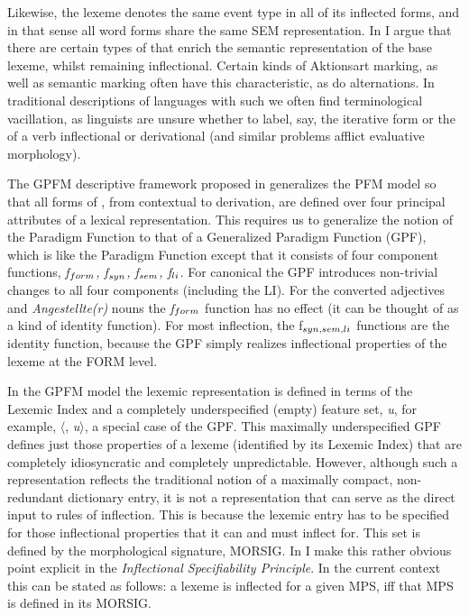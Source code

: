 \documentclass[output=paper,
modfonts
]{LSP/langsci}
\begin{document}
Likewise, the lexeme  denotes the same event type in all of its inflected forms, and in that sense all word forms share the same SEM representation. In \citet{Spencer13:book} I argue that there are certain types of  that enrich the semantic representation of the base lexeme, whilst remaining inflectional. Certain kinds of Aktionsart marking, as well as semantic  marking often have this characteristic, as do   alternations.  In traditional descriptions of languages with such  we often find terminological vacillation, as linguists are unsure whether to label, say, the iterative form or the  of a verb inflectional or derivational (and similar problems afflict evaluative morphology). 

The GPFM descriptive framework proposed in \citet{Spencer13:book} generalizes the PFM model 
so that all forms of , from contextual  to derivation, are defined over four principal attributes of a lexical representation. This requires us to generalize the notion of the Paradigm Function to that of a Generalized Paradigm Function  (GPF), which is like the Paradigm Function except that it consists of  four component functions, \textit{f$\sb{form}$, f$\sb{syn}$, f$\sb{sem}$, f$\sb{li}$}.  For canonical  the GPF introduces non-trivial changes to all four components (including the LI). For the converted adjectives and \emph{Angestellte(r)} nouns the \textit{f$\sb{form}$} function has no effect (it can be thought of as a kind of identity function). For most inflection,  the f$\sb{syn, sem, li}$ functions are the identity function, because the GPF simply realizes inflectional properties of the lexeme at the FORM level.  
   
In the GPFM model the lexemic representation is defined in terms of the Lexemic Index and a completely underspecified (empty) feature set, \emph{u}, for example, $\langle$, \emph{u}$\rangle$,  a special case of the GPF.  %
This maximally underspecified GPF defines just those properties of a lexeme (identified by its Lexemic Index) that are completely idiosyncratic and completely unpredictable. However, although such a representation reflects the traditional notion of a maximally compact, non-redundant  dictionary entry, it is not a representation that can serve as the direct input to rules of inflection. This is because the lexemic entry has to be specified for those inflectional properties that it can and must inflect for. This set is defined by the morphological signature, MORSIG. In \citet[199]{Spencer13:book} I make this rather obvious point explicit in the \emph{Inflectional Specifiability Principle}.  In the current context this can be stated as follows: a lexeme is inflected for a given MPS, iff that MPS is defined in its MORSIG.
\end{document}
